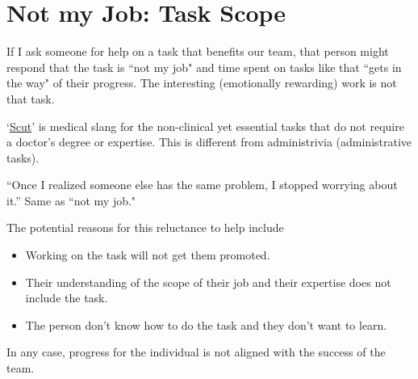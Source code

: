 \section{Not my Job: Task Scope}


If I ask someone for help on a task that benefits our team, that person might respond that the task is ``not my job" and time spent on tasks like that ``gets in the way" of their progress. The interesting (emotionally rewarding) work is not that task.

`\href{https://www.urbandictionary.com/define.php?term=scut}{Scut}' is medical slang for the non-clinical yet essential tasks that do not require a doctor's degree or expertise.
This is different from administrivia (administrative tasks).

``Once I realized someone else has the same problem, I stopped worrying about it.'' Same as ``not my job."

The potential reasons for this reluctance to help include
\begin{itemize}
    \item Working on the task will not get them promoted.
    \item Their understanding of the scope of their job and their expertise does not include the task.
    \item The person don't know how to do the task and they don't want to learn.
\end{itemize}
In any case, progress for the individual is not aligned with the success of the team.